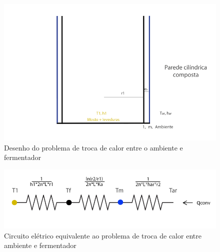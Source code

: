 \begin{figure}[h]
    \centering
    \includegraphics[scale=0.45]{figuras/projeto/controle/fermentador_controle.png}
    \caption{Desenho do problema de troca de calor entre o ambiente e fermentador}
    \label{fig:fermentador_controle}
\end{figure}

\begin{figure}[h]
    \centering
    \includegraphics[scale=0.40]{figuras/projeto/controle/fermentador_circuito.png}
    \caption{Circuito elétrico equivalente ao problema de troca de calor entre ambiente e fermentador}
    \label{fig:fermentador_circuito}
\end{figure}

